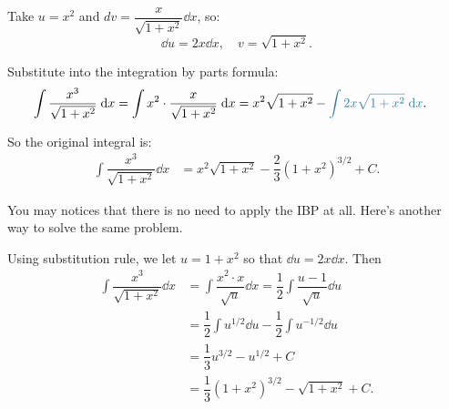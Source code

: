 \begin{ex}
Take $ u = x^2 $ and $ dv = \dfrac{x}{\sqrt{1+x^2}} \dd x $, so:
\[
\dd u = 2x \dd x, \quad v = \sqrt{1+x^2}.
\]

Substitute into the integration by parts formula:
\begin{align*}
    \int \dfrac{x^3}{\sqrt{1+x^2}} \dd x &= \int x^2 \cdot \dfrac{x}{\sqrt{1+x^2}} \dd x = x^2 \sqrt{1+x^2} - \blue{\int 2x \sqrt{1+x^2} \dd x}.
\end{align*}

So the original integral is:
\begin{align*}
    \int \dfrac{x^3}{\sqrt{1+x^2}} \dd x &= x^2 \sqrt{1+x^2} - \dfrac{2}{3} (1+x^2)^{3/2} + C.
\end{align*}
\end{ex}
You may notices that there is no need to apply the IBP at all. Here's another way to solve the same problem.
\begin{ex}
    Using substitution rule, we let $u = 1 + x^2 $ so that $\dd u = 2x \dd x$. Then
\begin{align*}
    \int \dfrac{x^3}{\sqrt{1+x^2}} \dd x &= \int \dfrac{x^2 \cdot x}{\sqrt{u}} \dd x = \dfrac{1}{2} \int \dfrac{u-1}{\sqrt{u}} \dd u \\
    &= \dfrac{1}{2} \int u^{1/2} \dd u - \dfrac{1}{2} \int u^{-1/2} \dd u \\
    &= \dfrac{1}{3} u^{3/2} - u^{1/2} + C \\
    &= \dfrac{1}{3} (1 + x^2)^{3/2} - \sqrt{1 + x^2} + C.
\end{align*}
\end{ex}

\newpage
